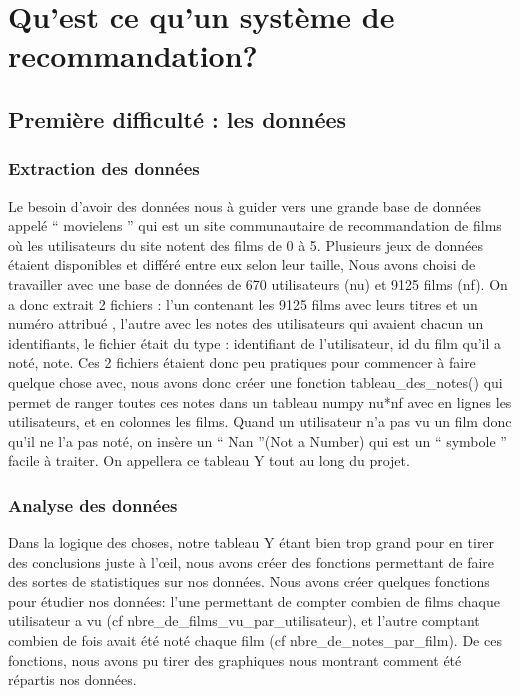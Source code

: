\documentclass[a4paper,10pt]{article}
\title{}
\author{}
\begin{document}
\maketitle

\begin{abstract}
\end{abstract}

\section{Qu'est ce qu'un système de recommandation?}
\subsection{Première difficulté : les données}
\subsubsection{Extraction des données}
Le besoin d'avoir des données nous à guider vers une grande base de données appelé `` movielens '' qui est un site communautaire de recommandation de films où les utilisateurs du site notent des films de 0 à 5.  
Plusieurs jeux de données étaient disponibles et différé entre eux selon leur taille,  
Nous avons choisi de travailler avec une base de données de 670 utilisateurs (nu) et 9125 films (nf).  
On a donc extrait 2 fichiers : l’un contenant les 9125 films avec leurs titres et un numéro attribué ,  
l’autre avec les notes des utilisateurs qui avaient chacun un identifiants,  
le fichier était du type : identifiant de l’utilisateur, id du film qu’il a noté, note. 
Ces 2 fichiers étaient donc peu pratiques pour commencer à faire quelque chose avec,  
nous avons donc créer une fonction tableau\_des\_notes() qui permet de ranger toutes ces notes dans un tableau numpy nu*nf avec en lignes les utilisateurs,  
et en colonnes les films. Quand un utilisateur n’a pas vu un film donc qu’il ne l’a pas noté,  
on insère un `` Nan ''(Not a Number) qui est un `` symbole '' facile à traiter. On appellera ce tableau Y tout au long du projet. 
\subsubsection{Analyse des données}
Dans la logique des choses, notre tableau Y étant bien trop grand pour en tirer des conclusions 
juste à l’œil, nous avons créer des fonctions permettant de faire des sortes de statistiques sur nos données.
Nous avons créer quelques fonctions pour étudier nos données: l’une permettant de compter combien de films
chaque utilisateur a vu (cf nbre_de_films_vu_par_utilisateur), et l’autre comptant combien de fois avait été noté chaque film 
(cf nbre_de_notes_par_film). De ces fonctions, nous avons pu tirer des graphiques nous montrant comment été répartis nos données.
\end{document}
